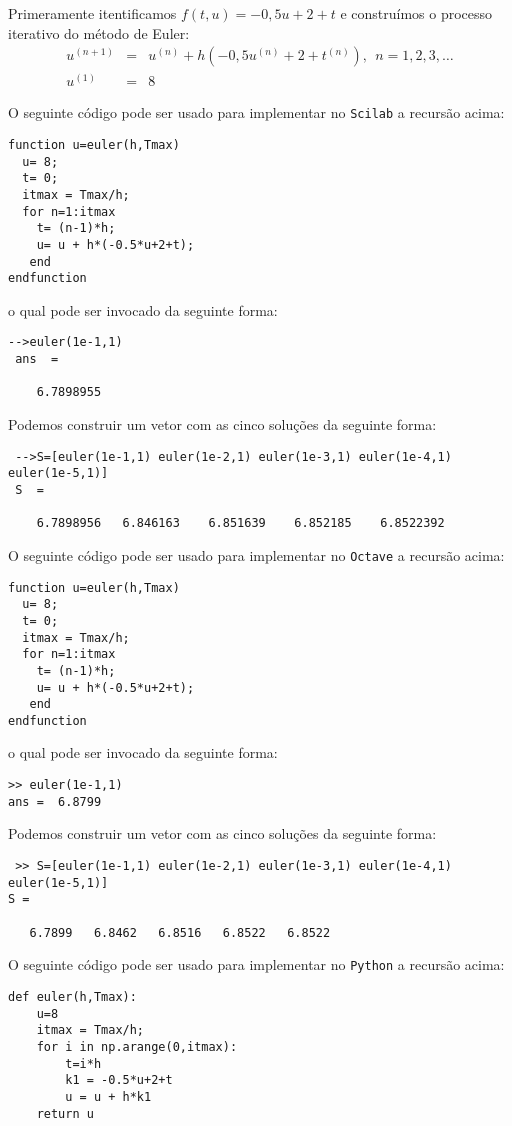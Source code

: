 \begin{resol} Primeramente itentificamos $f(t,u)=-0,5u+2+t$ e construímos o processo iterativo do método de Euler: 
\begin{eqnarray}
  u^{(n+1)}&=&u^{(n)} + h( -0,5u^{(n)}+2+t^{(n)}),~~n=1,2,3,\ldots\\
  u^{(1)}&=&8
\end{eqnarray}

\ifisscilab
O seguinte código pode ser usado para implementar no \verb+Scilab+ a recursão acima:
\begin{verbatim}
function u=euler(h,Tmax)
  u= 8;
  t= 0;
  itmax = Tmax/h;
  for n=1:itmax
    t= (n-1)*h;
    u= u + h*(-0.5*u+2+t);
   end
endfunction
\end{verbatim}
o qual pode ser invocado da seguinte forma:
\begin{verbatim}
-->euler(1e-1,1)
 ans  =
 
    6.7898955 
\end{verbatim}
Podemos construir um vetor com as cinco soluções da seguinte forma:
\begin{verbatim}
 -->S=[euler(1e-1,1) euler(1e-2,1) euler(1e-3,1) euler(1e-4,1) euler(1e-5,1)]
 S  =
 
    6.7898956   6.846163    6.851639    6.852185    6.8522392  
\end{verbatim}

\fi

\ifisoctave
O seguinte código pode ser usado para implementar no \verb+Octave+ a recursão acima:
\begin{verbatim}
function u=euler(h,Tmax)
  u= 8;
  t= 0;
  itmax = Tmax/h;
  for n=1:itmax
    t= (n-1)*h;
    u= u + h*(-0.5*u+2+t);
   end	
endfunction
\end{verbatim}
o qual pode ser invocado da seguinte forma:
\begin{verbatim}
>> euler(1e-1,1)
ans =  6.8799
\end{verbatim}
Podemos construir um vetor com as cinco soluções da seguinte forma:
\begin{verbatim}
 >> S=[euler(1e-1,1) euler(1e-2,1) euler(1e-3,1) euler(1e-4,1) euler(1e-5,1)]
S =

   6.7899   6.8462   6.8516   6.8522   6.8522
\end{verbatim}
\fi


\ifispython
O seguinte código pode ser usado para implementar no \verb+Python+ a recursão acima:

\begin{verbatim}
def euler(h,Tmax):
	u=8
  	itmax = Tmax/h;
	for i in np.arange(0,itmax):
		t=i*h
		k1 = -0.5*u+2+t
		u = u + h*k1
	return u


\end{verbatim}
\end{resol}
